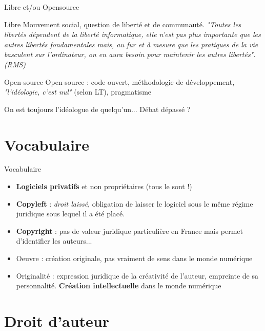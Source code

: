 \documentclass{beamer}
\begin{document}
\begin{frame}{Libre et/ou Opensource}

  \begin{block}{Libre}
    Mouvement social, question de liberté et de communauté. \textit{"Toutes les libertés dépendent de la liberté informatique, elle n’est pas plus importante que les autres libertés fondamentales mais, au fur et à mesure que les pratiques de la vie basculent sur l’ordinateur, on en aura besoin pour maintenir les autres libertés". (RMS)}
  \end{block}

  \begin{block}{Open-source}
    Open-source : code ouvert, méthodologie de développement, \textit{"l'idéologie, c'est nul"} (selon LT), pragmatisme
  \end{block}

On est toujours l'idéologue de quelqu'un... Débat dépassé ?
\end{frame}

\section{Vocabulaire}

\begin{frame}{Vocabulaire}

  \begin{itemize}
  \item \textbf{Logiciels privatifs} et non propriétaires (tous le sont !)
  \item \textbf{Copyleft} : \textit{droit laissé}, obligation de laisser le logiciel sous le même régime juridique sous lequel il a été placé.
  \item \textbf{Copyright} : pas de valeur juridique particulière en France mais permet d'identifier les auteurs...
  \item Oeuvre : création originale, pas vraiment de sens dans le monde numérique
  \item Originalité : expression juridique de la créativité de l'auteur, empreinte de sa personnalité. \textbf{Création intellectuelle} dans le monde numérique
  \end{itemize}
\end{frame}

\section{Droit d'auteur}
\end{document}
